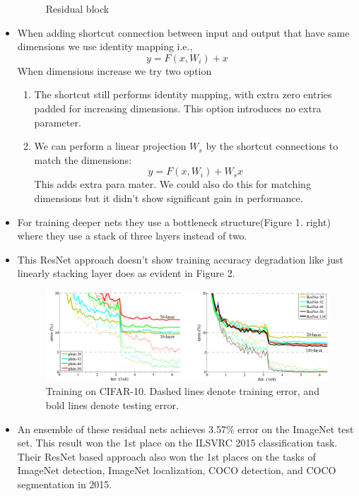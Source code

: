 \documentclass{article}
\begin{document}
\begin{itemize}
\begin{figure}[H]
        \caption{Residual block}
        \label{fig:Figure 1}
    \end{figure}
    \item When adding shortcut connection between input and output that have same dimensions we use identity mapping i.e.,
    \begin{equation*}
        y = F(x, {W_i}) + x 
    \end{equation*}
    When dimensions increase we try two option
    \begin{enumerate}
        \item The shortcut still performs identity mapping, with extra zero entries padded for increasing dimensions. This option introduces no extra parameter.
        \item We can perform a linear projection $W_s$ by the shortcut connections to match the dimensions:
        \begin{equation*}
            y = F(x, {W_i}) + W_s x 
        \end{equation*}
        This adds extra para mater. We could also do this for matching dimensions but it didn't show significant gain in performance.
    \end{enumerate}
    \item For training deeper nets they use a bottleneck structure(Figure 1. right) where they use a stack of three layers instead of two. 
    \item This ResNet approach doesn't show training accuracy degradation like just linearly stacking layer does as evident in Figure 2.
    \begin{figure}[H]
        \centering
        \includegraphics[scale=0.26]{cifar10_results.png}
        \caption{Training on CIFAR-10. Dashed lines denote training error, and bold lines denote testing error.}
        \label{fig:Figure 2}
    \end{figure}
    \item An ensemble of these residual nets achieves 3.57\% error on the ImageNet test set. This result won the 1st place on the ILSVRC 2015 classification task. Their ResNet based approach also won the 1st places on the tasks of ImageNet detection, ImageNet localization, COCO detection, and COCO segmentation in 2015.

\end{itemize}
\end{document}
